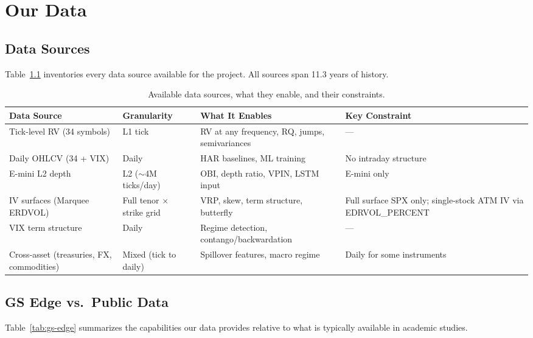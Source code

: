 \chapter{Our Data}
\label{ch:our-data}

\section{Data Sources}
\label{sec:data-sources}

Table~\ref{tab:data-sources} inventories every data source available for the project.
All sources span 11.3 years of history.

\begin{table}[htbp]
\centering
\caption{Available data sources, what they enable, and their constraints.}
\label{tab:data-sources}
\small
\begin{tabular}{%
  >{\raggedright\arraybackslash}p{2.8cm}
  >{\raggedright\arraybackslash}p{2.2cm}
  >{\raggedright\arraybackslash}p{4.0cm}
  >{\raggedright\arraybackslash}p{3.8cm}}
\toprule
\textbf{Data Source} & \textbf{Granularity} & \textbf{What It Enables} & \textbf{Key Constraint} \\
\midrule
Tick-level RV (34 symbols) &
  L1 tick &
  RV at any frequency, RQ, jumps, semivariances &
  --- \\[6pt]
Daily OHLCV (34 + VIX) &
  Daily &
  HAR baselines, ML training &
  No intraday structure \\[6pt]
E-mini L2 depth &
  L2 (${\sim}$4M ticks/day) &
  OBI, depth ratio, VPIN, LSTM input &
  E-mini only \\[6pt]
IV surfaces (Marquee ERDVOL) &
  Full tenor $\times$ strike grid &
  VRP, skew, term structure, butterfly &
  Full surface SPX only; single-stock ATM IV via EDRVOL\_PERCENT \\[6pt]
VIX term structure &
  Daily &
  Regime detection, contango/backwardation &
  --- \\[6pt]
Cross-asset (treasuries, FX, commodities) &
  Mixed (tick to daily) &
  Spillover features, macro regime &
  Daily for some instruments \\
\bottomrule
\end{tabular}
\end{table}


\section{GS Edge vs.\ Public Data}
\label{sec:gs-edge}

Table~\ref{tab:gs-edge} summarizes the capabilities our data provides relative to what is typically available in academic studies.


